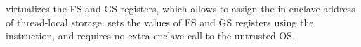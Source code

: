 

\sgx{} virtualizes the FS and GS registers,
which allows \graphenesgx{} to assign the in-enclave address of thread-local storage.
\graphenesgx{} sets the values of FS and GS registers
using the  instruction,
and requires no extra enclave call to the untrusted OS.


